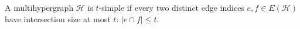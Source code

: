 \begin{definition}
A multihypergraph $\mathcal H$ is $t$-simple if every two distinct edge
indices $e,f\in E(\mathcal H)$ have intersection size at most $t$:
$|e\cap f|\le t$.
\end{definition}
